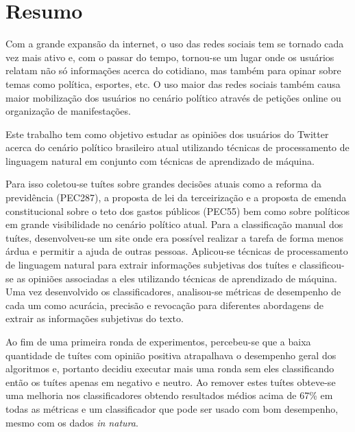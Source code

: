 \chapter*{Resumo}

Com a grande expansão da internet, o uso das redes sociais tem se tornado cada vez
mais ativo e, com o passar do tempo, tornou-se um lugar onde os usuários relatam não
só informações acerca do cotidiano, mas também para opinar sobre temas como política,
esportes, etc. O uso maior das redes sociais também causa maior mobilização dos usuários
no cenário político através de petições online ou organização de manifestações.

Este trabalho tem como objetivo estudar as opiniões dos usuários do Twitter acerca
do cenário político brasileiro atual utilizando técnicas de processamento de linguagem
natural em conjunto com técnicas de aprendizado de máquina. 

Para isso coletou-se tuítes sobre grandes decisões
atuais como a reforma da previdência (PEC287), a proposta de lei da terceirização e a
proposta de emenda constitucional sobre o teto dos gastos públicos (PEC55) bem como sobre
políticos em grande visibilidade no cenário político atual. Para a classificação manual
dos tuítes, desenvolveu-se um site onde era possível realizar a tarefa de forma menos
árdua e permitir a ajuda de outras pessoas.
Aplicou-se técnicas de processamento de linguagem natural para
extrair informações subjetivas dos tuítes e classificou-se as opiniões associadas a eles
utilizando técnicas de aprendizado de máquina.
Uma vez desenvolvido os classificadores, analisou-se métricas de desempenho de cada um como
acurácia, precisão e revocação para diferentes abordagens de extrair as informações subjetivas
do texto.

Ao fim de uma primeira ronda de experimentos, percebeu-se que a baixa quantidade de tuítes com
opinião positiva atrapalhava o desempenho geral dos algoritmos e, portanto decidiu executar mais
uma ronda sem eles classificando então os tuítes apenas em negativo e neutro. Ao remover estes tuítes
obteve-se uma melhoria nos classificadores obtendo resultados médios acima de 67\% em todas as
métricas e um classificador que pode ser usado com bom desempenho, mesmo com os dados 
\textit{in natura}.

